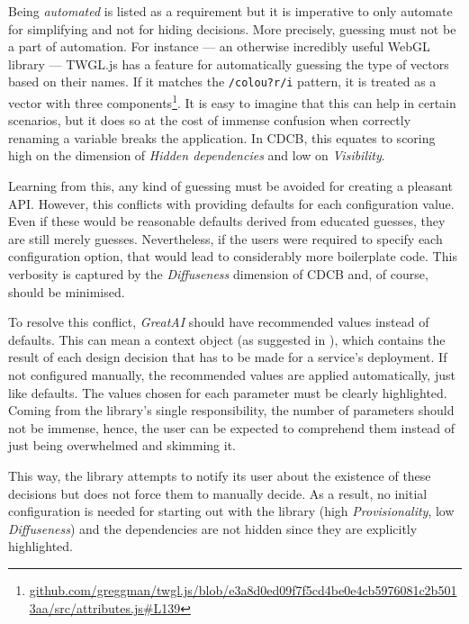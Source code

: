 Being \textit{automated} is listed as a requirement but it is imperative to only automate for simplifying and not for hiding decisions. More precisely, guessing must not be a part of automation. For instance --- an otherwise incredibly useful WebGL library --- TWGL.js has a feature for automatically guessing the type of vectors based on their names. If it matches the \texttt{/colou?r/i} pattern, it is treated as a vector with three components\footnote{\href{https://github.com/greggman/twgl.js/blob/e3a8d0ed09f7f5cd4be0e4cb5976081c2b5013aa/src/attributes.js\#L139}{\tiny github.com/greggman/twgl.js/blob/e3a8d0ed09f7f5cd4be0e4cb5976081c2b5013aa/src/attributes.js\#L139}}. It is easy to imagine that this can help in certain scenarios, but it does so at the cost of immense confusion when correctly renaming a variable breaks the application. In CDCB, this equates to scoring high on the dimension of \textit{Hidden dependencies} and low on \textit{Visibility}.

Learning from this, any kind of guessing must be avoided for creating a pleasant API. However, this conflicts with providing defaults for each configuration value. Even if these would be reasonable defaults derived from educated guesses, they are still merely guesses. Nevertheless, if the users were required to specify each configuration option, that would lead to considerably more boilerplate code. This verbosity is captured by the \textit{Diffuseness} dimension of CDCB and, of course, should be minimised.

To resolve this conflict, \textit{GreatAI} should have recommended values instead of defaults. This can mean a context object (as suggested in \cite{ousterhout2018philosophy}), which contains the result of each design decision that has to be made for a service's deployment. If not configured manually, the recommended values are applied automatically, just like defaults. The values chosen for each parameter must be clearly highlighted. Coming from the library's single responsibility, the number of parameters should not be immense, hence, the user can be expected to comprehend them instead of just being overwhelmed and skimming it.

This way, the library attempts to notify its user about the existence of these decisions but does not force them to manually decide. As a result, no initial configuration is needed for starting out with the library (high \textit{Provisionality}, low \textit{Diffuseness}) and the dependencies are not hidden since they are explicitly highlighted.

